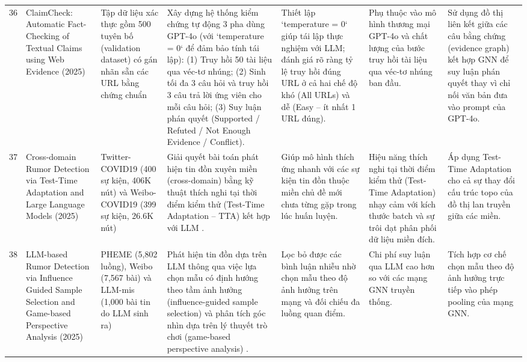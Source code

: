 \documentclass[11pt,a4paper]{extreport}
\begin{document}
\begin{landscape}
\begin{longtable}{@{}C{0.6cm}p{3.6cm}p{2.7cm}p{4.8cm}p{3.6cm}p{3.6cm}p{3.6cm}@{}}
36 & ClaimCheck: Automatic Fact-Checking of Textual Claims using Web Evidence (2025) \cite{noauthor_claimcheck_2025} & Tập dữ liệu xác thực gồm 500 tuyên bố (validation dataset) có gán nhãn sẵn các URL bằng chứng chuẩn & Xây dựng hệ thống kiểm chứng tự động 3 pha dùng GPT-4o (với `temperature = 0` để đảm bảo tính tái lập): (1) Truy hồi 50 tài liệu qua véc-tơ nhúng; (2) Sinh tối đa 3 câu hỏi và truy hồi 3 câu trả lời ứng viên cho mỗi câu hỏi; (3) Suy luận phán quyết (Supported / Refuted / Not Enough Evidence / Conflict). & Thiết lập `temperature = 0` giúp tái lập thực nghiệm với LLM; đánh giá rõ ràng tỷ lệ truy hồi đúng URL ở cả hai chế độ khó (All URLs) và dễ (Easy -- ít nhất 1 URL đúng). & Phụ thuộc vào mô hình thương mại GPT-4o và chất lượng của bước truy hồi tài liệu qua véc-tơ nhúng ban đầu. & Sử dụng đồ thị liên kết giữa các câu bằng chứng (evidence graph) kết hợp GNN để suy luận phán quyết thay vì chỉ nối văn bản đưa vào prompt của GPT-4o. \\ 

37 & Cross-domain Rumor Detection via Test-Time Adaptation and Large Language Models (2025) \cite{noauthor_cross-domain_2025} & Twitter-COVID19 (400 sự kiện, 406K nút) và Weibo-COVID19 (399 sự kiện, 26.6K nút) & Giải quyết bài toán phát hiện tin đồn xuyên miền (cross-domain) bằng kỹ thuật thích nghi tại thời điểm kiểm thử (Test-Time Adaptation -- TTA) kết hợp với LLM \cite{noauthor_cross-domain_2025}. & Giúp mô hình thích ứng nhanh với các sự kiện tin đồn thuộc miền chủ đề mới chưa từng gặp trong lúc huấn luyện. & Hiệu năng thích nghi tại thời điểm kiểm thử (Test-Time Adaptation) nhạy cảm với kích thước batch và sự trôi dạt phân phối dữ liệu miền đích. & Áp dụng Test-Time Adaptation cho cả sự thay đổi cấu trúc topo của đồ thị lan truyền giữa các miền. \\ 

38 & LLM-based Rumor Detection via Influence Guided Sample Selection and Game-based Perspective Analysis (2025) \cite{noauthor_llm-based_2025} & PHEME (5,802 luồng), Weibo (7,567 bài) và LLM-mis (1,000 bài tin do LLM sinh ra) & Phát hiện tin đồn dựa trên LLM thông qua việc lựa chọn mẫu có định hướng theo tầm ảnh hưởng (influence-guided sample selection) và phân tích góc nhìn dựa trên lý thuyết trò chơi (game-based perspective analysis) \cite{noauthor_llm-based_2025}. & Lọc bỏ được các bình luận nhiễu nhờ chọn mẫu theo độ ảnh hưởng trên mạng và đối chiếu đa luồng quan điểm. & Chi phí suy luận qua LLM cao hơn so với các mạng GNN truyền thống. & Tích hợp cơ chế chọn mẫu theo độ ảnh hưởng trực tiếp vào phép pooling của mạng GNN. \\ 


\end{longtable}
\end{landscape}
\end{document}
